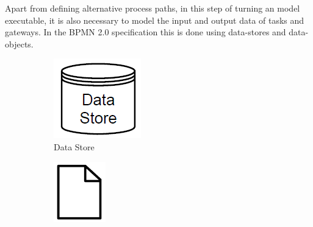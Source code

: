 Apart from defining alternative process paths, in this step of turning an model executable, it is also necessary to model the input and output data of tasks and gateways. In the BPMN 2.0 specification this is done using \gls{data-store}s and \gls{data-object}s. 

\begin{figure}[H]
	\centering
	\begin{subfigure}[b]{0.18\columnwidth}
	\centering
	\includegraphics[width=0.9\columnwidth]{graphics/data-store}
	\caption{Data Store} 
	\label{fig:datastore} 
	\end{subfigure}
	\begin{subfigure}[b]{0.18\columnwidth}
		\centering
		\includegraphics[width=0.8\columnwidth]{graphics/data-object}

\end{subfigure}
\end{figure}
